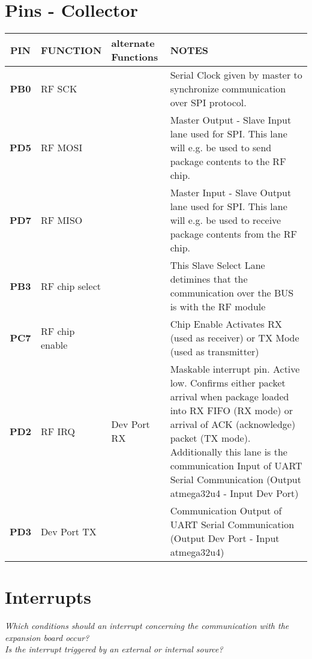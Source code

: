 \documentclass[12pt]{article}
\begin{document}
\vspace{1cm}

\newpage
\section*{Pins - Collector}
\small
\begin{tabular}{| c || p{30mm} | p{30mm} | p{60mm} |}
  \hline
  \textbf{PIN} & FUNCTION & alternate Functions & NOTES\\
  \hline
  \hline
  \textbf{PB0} & RF SCK &  & Serial Clock given by master to synchronize communication over SPI protocol. \\
  \hline
  \textbf{PD5} & RF MOSI &  & Master Output - Slave Input lane used for SPI. This lane will e.g. be used to send package contents to the RF chip.\\
  \hline
  \textbf{PD7} & RF MISO &  & Master Input - Slave Output lane used for SPI. This lane will e.g. be used to receive package contents from the RF chip.\\
  \hline
  \textbf{PB3} & RF chip select &  & This Slave Select Lane detimines that the communication over the BUS is with the RF module\\
  \hline
  \textbf{PC7} & RF chip enable &  & Chip Enable Activates RX (used as receiver) or TX Mode (used as transmitter) \\
  \hline
  \textbf{PD2} & RF IRQ & Dev Port RX & Maskable interrupt pin. Active low. Confirms either packet arrival when package loaded into RX FIFO (RX mode) or arrival of ACK (acknowledge) packet (TX mode). Additionally this lane is the communication Input of UART Serial Communication (Output atmega32u4 - Input Dev Port) \\
  \hline
  \textbf{PD3} & Dev Port TX &  & Communication Output of UART Serial Communication (Output Dev Port - Input atmega32u4) \\
  \hline
\end{tabular}
\normalsize

\newpage
\section*{Interrupts}

\textit{Which conditions should an interrupt concerning the communication with the expansion board occur?} \\
\textit{Is the interrupt triggered by an external or internal source?} \\
\end{document}
